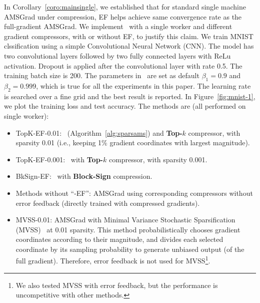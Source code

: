 \documentclass[11pt]{article}
\begin{document}
In Corollary~\ref{coro:mainsingle}, we established that for standard single machine AMSGrad under compression, EF helps achieve same convergence rate as the full-gradient AMSGrad. We implement \algo\ with a single worker and different gradient compressors, with or without EF, to justify this claim. We train MNIST clssification using a simple Convolutional Neural Network (CNN). The model has two convolutional layers followed by two fully connected layers with ReLu activation. Dropout is applied after the convolutional layer with rate 0.5. The training batch size is 200. The parameters in \algo\ are set as default $\beta_1=0.9$ and $\beta_2=0.999$, which is true for all the experiments in this paper. The learning rate is searched over a fine grid and the best result is reported. In Figure~\ref{fig:mnist-1}, we plot the training loss and test accuracy. The methods are (all performed on single worker):
\begin{itemize}
    \item TopK-EF-0.01: \algo\ (Algorithm~\ref{alg:sparsams}) and \textbf{Top-$k$} compressor, with sparsity 0.01 (i.e., keeping 1\% gradient coordinates with largest magnitude).
    
    \item TopK-EF-0.001: \algo\ with \textbf{Top-$k$} compressor, with sparsity 0.001.
    
    \item BkSign-EF: \algo\ with \textbf{Block-Sign} compression.
    
    \item Methods without ``-EF'':  AMSGrad using corresponding compressors without error feedback (directly trained with compressed gradients).
    
    \item MVSS-0.01: AMSGrad with Minimal Variance Stochastic Sparsification (MVSS)~\cite{wangni2018gradient} at 0.01 sparsity. This method probabilistically chooses gradient coordinates according to their magnitude, and divides each selected coordinate by its sampling probability to generate unbiased output (of the full gradient). Therefore, error feedback is not used for MVSS\footnote{We also tested MVSS with error feedback, but the performance is uncompetitive with other methods.}.
\end{itemize}
\end{document}

